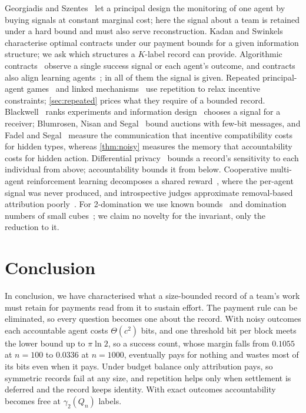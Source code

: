 \documentclass[sigconf,anonymous,acmthm=false]{aamas}
\theoremstyle{acmplain}
\theoremstyle{acmdefinition}
\begin{document}
Georgiadis and Szentes~\cite{georgiadisszentes2020} let a principal design the monitoring of
one agent by buying signals at constant marginal cost; here the signal about a team is
retained under a hard bound and must also serve reconstruction. Kadan and
Swinkels~\cite{kadanswinkels2008} characterise optimal contracts under our payment bounds for
a given information structure; we ask which structures a $K$-label record can provide.
Algorithmic contracts~\cite{dutting2024survey,babaioff2006combinatorial,dutting2025multiagent,dutting2025combinatorial,castiglioni2023multiagent,goel2024weighted}
observe a single success signal or each agent's outcome, and contracts also align learning
agents~\cite{haupt2023contracts,ivanov2024principal,shao2025truth}; in all of them the signal
is given. Repeated principal-agent games~\cite{radner1985repeated} and linked
mechanisms~\cite{jacksonsonnenschein2007} use repetition to relax incentive constraints;
\cref{sec:repeated} prices what they require of a bounded record. Blackwell~\cite{blackwell1953comparisons} ranks experiments and
information design~\cite{kamenica2011persuasion} chooses a signal for a receiver; Blumrosen,
Nisan and Segal~\cite{blumrosen2007auctions} bound auctions with few-bit messages, and Fadel
and Segal~\cite{fadelsegal2009} measure the communication that incentive compatibility costs
for hidden types, whereas \cref{thm:noisy} measures the memory that accountability costs for
hidden action. Differential privacy~\cite{dwork2006calibrating} bounds a record's sensitivity
to each individual from above; accountability bounds it from below. Cooperative multi-agent
reinforcement learning decomposes a shared
reward~\cite{foerster2018coma,sunehag2018vdn,rashid2018qmix,li2025nucleolus}, where the
per-agent signal was never produced, and introspective judges approximate removal-based
attribution poorly~\cite{lu2026agents}. For 2-domination we use known
bounds~\cite{fink1985ndomination,chellali2012survey,bujtas2016bounds} and domination numbers
of small cubes~\cite{ostergard2001length9}; we claim no novelty for the invariant, only the
reduction to it.

\section{Conclusion}\label{sec:conclusion}

In conclusion, we have characterised what a size-bounded record of a team's work must retain
for payments read from it to sustain effort. The payment rule can be eliminated, so every
question becomes one about the record. With noisy outcomes each accountable agent costs
$\Theta(c^2)$ bits, and one threshold bit per block meets the lower bound up to $\pi\ln2$, so
a success count, whose margin falls from $0.1055$ at $n=100$ to $0.0336$ at $n=1000$,
eventually pays for nothing and wastes most of its bits even when it pays.
Under budget balance only attribution pays, so symmetric records fail at any size, and
repetition helps only when settlement is deferred and the record keeps identity. With exact
outcomes accountability becomes free at $\gamma_2(Q_n)$ labels.
\end{document}
